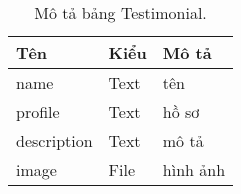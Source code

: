 	
	\begin{table}[h!]
		\begin{center}
			\caption{Mô tả bảng Testimonial.}
			\begin{tabularx}{0.6\textwidth}{ |l|l|X| } 
				\hline
				Tên & Kiểu & Mô tả \\
				\hline
				name & Text & tên \\
				profile & Text & hồ sơ \\
				description & Text & mô tả \\
				image & File & hình ảnh \\ 
				\hline
			\end{tabularx}
			\label{table:Testimonial}
		\end{center}
	\end{table}
	